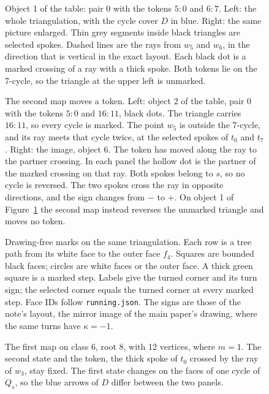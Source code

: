 
\clearpage
\begin{figure}[p]\centering
\caption{Object 1 of the table: pair 0 with the tokens $5{:}0$ and $6{:}7$. Left: the whole triangulation, with the cycle cover $D$ in blue. Right: the same picture enlarged. Thin grey segments inside black triangles are selected spokes. Dashed lines are the rays from $w_5$ and $w_6$, in the direction that is vertical in the exact layout. Each black dot is a marked crossing of a ray with a thick spoke. Both tokens lie on the 7-cycle, so the triangle at the upper left is unmarked.}\label{fig:marked}\end{figure}
\begin{figure}[p]\centering
\caption{The second map moves a token. Left: object 2 of the table, pair 0 with the tokens $5{:}0$ and $16{:}11$, black dots. The triangle carries $16{:}11$, so every cycle is marked. The point $w_5$ is outside the 7-cycle, and its ray meets that cycle twice, at the selected spokes of $t_0$ and $t_7$. Right: the image, object 6. The token has moved along the ray to the partner crossing. In each panel the hollow dot is the partner of the marked crossing on that ray. Both spokes belong to $s$, so no cycle is reversed. The two spokes cross the ray in opposite directions, and the sign changes from $-$ to $+$. On object 1 of Figure~\ref{fig:marked} the second map instead reverses the unmarked triangle and moves no token.}\label{fig:second}\end{figure}
\clearpage
\begin{figure}[p]\centering
\caption{Drawing-free marks on the same triangulation. Each row is a tree path from its white face to the outer face $f_4$. Squares are bounded black faces; circles are white faces or the outer face. A thick green square is a marked step. Labels give the turned corner and its turn sign; the selected corner equals the turned corner at every marked step. Face IDs follow \texttt{running.json}. The signs are those of the note's layout, the mirror image of the main paper's drawing, where the same turns have $\kappa=-1$.}\label{fig:paths}\end{figure}
\begin{figure}[p]\centering
\caption{The first map on class 6, root 8, with 12 vertices, where $m=1$. The second state and the token, the thick spoke of $t_0$ crossed by the ray of $w_3$, stay fixed. The first state changes on the faces of one cycle of $Q_s$, so the blue arrows of $D$ differ between the two panels.}\label{fig:first}\end{figure}
\clearpage
